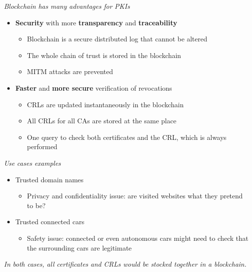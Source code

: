 \begin{frame}
\emph{Blockchain has many advantages for PKIs}

\begin{itemize}
\item \textbf{Security} with more \textbf{transparency} and \textbf{traceability}
\begin{itemize}
\item Blockchain is a secure distributed log that cannot be altered
\item The whole chain of trust is stored in the blockchain
\item MITM attacks are prevented
\end{itemize}
\item \textbf{Faster} and \textbf{more secure} verification of revocations
\begin{itemize}
\item CRLs are updated instantaneously in the blockchain
\item All CRLs for all CAs are stored at the same place
\item One query to check both certificates and the CRL, which is always performed
\end{itemize}
\end{itemize}

\end{frame}

\begin{frame}
\emph{Use cases examples}


\begin{itemize}
\item Trusted domain names
\begin{itemize}
\item Privacy and confidentiality issue: are visited websites what they pretend to be?
\end{itemize}
\item Trusted connected cars
\begin{itemize}
\item Safety issue: connected or even autonomous cars might need to check that the surrounding cars are legitimate
\end{itemize}
\end{itemize}

\emph{In both cases, all certificates and CRLs would be stocked together in a blockchain.}





\end{frame}